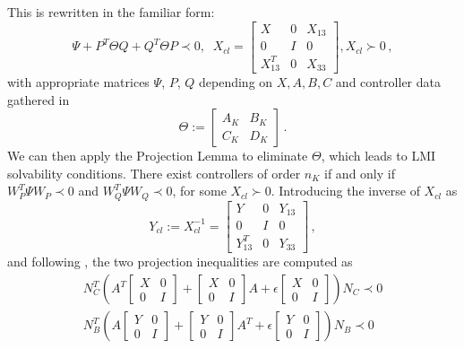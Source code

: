 \documentclass[12pt, a4paper,reqno]{amsart}
\theoremstyle{definition}
\begin{document}
This  is  rewritten in the  familiar form: 
\begin{equation}
\label{eq-BMI2}
\Psi + P^T \Theta Q + Q^T \Theta P \prec 0, \;  \;X_{cl} = \begin{bmatrix}X & 0 & X_{13} \\ 0 &  I & 0 \\ X_{13}^T & 0 & X_{33} \end{bmatrix}, X_{cl} \succ 0 \,,
\end{equation}
with appropriate matrices $\Psi$, $P$, $Q$ depending on $X,A,B,C$ and controller data gathered in 
$$\Theta := \begin{bmatrix}A_K & B_K \\ C_K & D_K \end{bmatrix}\,.$$
We can then apply the Projection Lemma \cite{gahinet1994linear} to eliminate $\Theta$, which
leads to LMI solvability conditions. There exist controllers of order $n_K$ if and only if $W_P^T \Psi W_P \prec 
 0$ and  $W_Q^T \Psi W_Q \prec 
 0 $, for some $X_{cl} \succ 0$.  Introducing the inverse of $X_{cl}$ as 
$$Y_{cl}:=X_{cl}^{-1} = \begin{bmatrix}Y & 0 & Y_{13} \\ 0 &  I & 0 \\ Y_{13}^T & 0 & Y_{33} \end{bmatrix}\,, $$ and following \cite{gahinet1994linear}, the two projection inequalities  are computed as 
\begin{equation}\label{proj1}\begin{split}
    N_C^T\left( A^T \begin{bmatrix}X & 0 \\0 & I \end{bmatrix}+  \begin{bmatrix}X & 0 \\0 & I \end{bmatrix} A + \epsilon \begin{bmatrix}X & 0 \\0 & I \end{bmatrix} \right)N_C \prec 0 \\
    N_B^T\left( A \begin{bmatrix}Y & 0 \\0 & I \end{bmatrix}+  \begin{bmatrix}Y & 0 \\0 & I \end{bmatrix} A^T + \epsilon \begin{bmatrix}Y & 0 \\0 & I \end{bmatrix} \right)N_B \prec 0 
\end{split}\end{equation}
\end{document}

